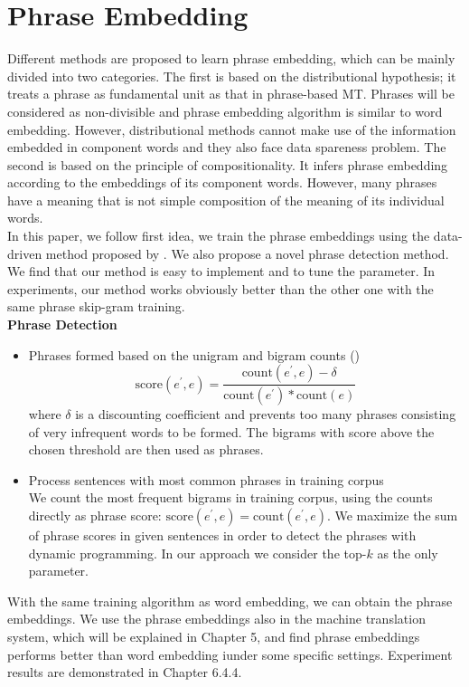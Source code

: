 \section{Phrase Embedding}
Different methods are proposed to learn phrase embedding, which can be mainly divided into two categories. The first is based on the distributional hypothesis; it treats a phrase as fundamental unit as that in phrase-based MT. Phrases will be considered as non-divisible and phrase embedding algorithm is similar to word embedding. However, distributional methods cannot make use of the information embedded in component words and they also face data spareness problem. The second is based on the principle of compositionality. It infers phrase embedding according to the embeddings of its component words. However,  many phrases have a meaning that is not simple composition of the meaning of its individual words. \\
In this paper, we follow first idea, we train the phrase embeddings using the data-driven method proposed by \cite{mikolov2013distributed}. We also propose a novel phrase detection method. We find that our method is easy to implement and to tune the parameter. In experiments, our method works obviously better than the other one with the same phrase skip-gram training.\\

\textbf{Phrase Detection}
\begin{itemize}
	\item Phrases formed based on the unigram and bigram counts (\cite{mikolov2013distributed})\\
	\[\text{score}(e^{\prime}, e) = \frac{\text{count}(e^{\prime}, e)-\delta}{\text{count}(e^{\prime}) * \text{count}(e)} \]
	where $\delta$ is a discounting coefficient and prevents too many phrases consisting of very infrequent words to be formed. The bigrams with score above the chosen threshold are then used as
	phrases. 
	\item Process sentences with most common phrases in training corpus\\
	We count the most frequent bigrams in training corpus, using the counts directly as phrase score: $\text{score}(e^{\prime}, e) = \text{count}(e^{\prime}, e)$. We maximize the sum of phrase scores in given sentences in order to detect the phrases with dynamic programming. In our approach we consider the top-$k$ as the only parameter.
\end{itemize}

With the same training algorithm as word embedding, we can obtain the phrase embeddings. We use the phrase embeddings also in the machine translation system, which will be explained in Chapter 5, and find phrase embeddings performs better than word embedding iunder some specific settings. Experiment results are demonstrated in Chapter 6.4.4.